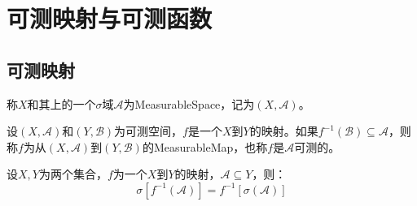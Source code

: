 \section{可测映射与可测函数}
\subsection{可测映射}
\begin{definition}
	称$X$和其上的一个$\sigma$域$\mathscr{A}$为\gls{MeasurableSpace}，记为$(X,\mathscr{A})$。
\end{definition}
\begin{definition}
	设$(X,\mathscr{A})$和$(Y,\mathscr{B})$为可测空间，$f$是一个$X$到$Y$的映射。如果$f^{-1}(\mathscr{B})\subseteq\mathscr{A}$，则称$f$为从$(X,\mathscr{A})$到$(Y,\mathscr{B})$的\gls{MeasurableMap}，也称$f$是$\mathscr{A}$可测的。
\end{definition}
\begin{lemma}\label{lem:PreimageSigmaField}
	设$X,Y$为两个集合，$f$为一个$X$到$Y$的映射，$\mathscr{A}\subseteq Y$，则：
	\begin{equation*}
		\sigma[f^{-1}(\mathscr{A})]=f^{-1}[\sigma(\mathscr{A})]
	\end{equation*}
\end{lemma}
